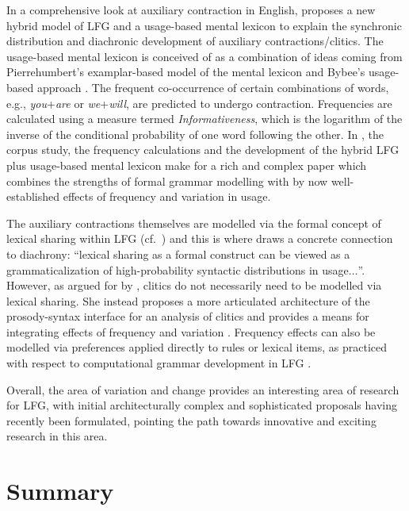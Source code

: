 \documentclass[output=paper,hidelinks]{langscibook}
\begin{document}
In a comprehensive look at auxiliary contraction in English, \citet{bresnan21} proposes a new hybrid model of LFG and a usage-based  mental  lexicon to explain the synchronic distribution and diachronic development of auxiliary contractions/clitics.  The usage-based mental lexicon is conceived of as a combination of ideas coming from Pierrehumbert's examplar-based model of the mental lexicon \citep{pierrehumbert2001,pierrehumbert2002}  and Bybee's usage-based approach \citep{Bybee2006}. 
The frequent co-occurrence of certain combinations of words, e.g., \textit{you}+\textit{are} or \textit{we}+\textit{will}, are predicted to undergo contraction. Frequencies are calculated using a measure termed \textit{Informativeness}, which is the logarithm of the inverse of the conditional probability of one word following the other.  In \citet{bresnan21}, the corpus study, the frequency calculations and the development of the hybrid LFG plus usage-based mental lexicon make for a rich and complex paper which combines the strengths of formal grammar modelling with by now well-established effects of frequency and variation in usage. 

The auxiliary contractions themselves are modelled via the formal concept of lexical sharing  within LFG (cf.~) and this is where \citet{bresnan21} draws a concrete connection to diachrony:  ``lexical sharing as a formal construct
can be viewed as a grammaticalization of high-probability syntactic distributions in
usage$\ldots$''.  However, as argued for by  \citet{Boegel2015}, clitics do not necessarily need to be modelled via lexical sharing. She instead proposes a more articulated architecture of the prosody-syntax interface for an analysis of clitics and provides a means for integrating effects of frequency and variation \citep{BoegelTurk2019}.  Frequency effects can also be modelled via preferences applied directly to rules or lexical items, as practiced with respect to computational grammar development in LFG \citep{franketal01,dost-king-2009-using}. 

Overall, the area of variation and change provides an interesting area of research for LFG, with initial architecturally complex and sophisticated proposals having recently been formulated, pointing the path towards innovative and exciting research in this area. 

\section{Summary}
\label{sec:Historical:sum}
\end{document}
